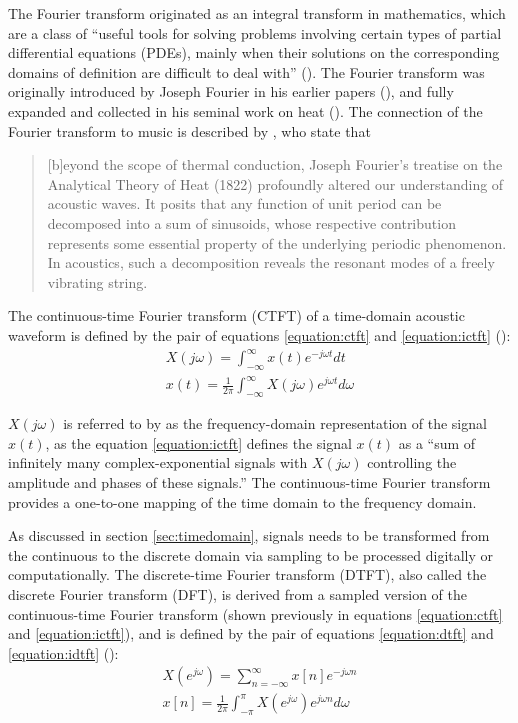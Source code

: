 \documentclass[report.tex]{subfiles}
\begin{document}
The Fourier transform originated as an integral transform in mathematics, which are a class of ``useful tools for solving problems involving certain types of partial differential equations (PDEs), mainly when their solutions on the corresponding domains of definition are difficult to deal with'' (\cite{fourierhistory}). The Fourier transform was originally introduced by Joseph Fourier in his earlier papers (\cite{fourierhist1, fourierhist2}), and fully expanded and collected in his seminal work on heat (\cite{fourierheat}). The connection of the Fourier transform to music is described by \textcite{fouriermusic}, who state that

\begin{quote}
	[b]eyond the scope of thermal conduction, Joseph Fourier's treatise on the Analytical Theory of Heat (1822) profoundly altered our understanding of acoustic waves. It posits that any function of unit period can be decomposed into a sum of sinusoids, whose respective contribution represents some essential property of the underlying periodic phenomenon. In acoustics, such a decomposition reveals the resonant modes of a freely vibrating string.
\end{quote}

The continuous-time Fourier transform (CTFT) of a time-domain acoustic waveform is defined by the pair of equations \ref{equation:ctft} and \ref{equation:ictft} (\cite[Chapter~11]{dspfirst}):
\begin{align}
	X(j\omega) = \int_{-\infty}^{\infty}{x(t)e^{-j\omega t}\mathit{dt}} \tag{1}\label{equation:ctft} \\
	x(t) = \frac{1}{2\pi}\int_{-\infty}^{\infty}{X(j\omega)e^{j\omega t}\mathit{d\omega}} \tag{2}\label{equation:ictft}
\end{align}

$X(j\omega)$ is referred to by \textcite{dspfirst} as the frequency-domain representation of the signal $x(t)$, as the equation \ref{equation:ictft} defines the signal $x(t)$ as a ``sum of infinitely many complex-exponential signals with $X(j\omega)$ controlling the amplitude and phases of these signals.'' The continuous-time Fourier transform provides a one-to-one mapping of the time domain to the frequency domain.

As discussed in section \ref{sec:timedomain}, signals needs to be transformed from the continuous to the discrete domain via sampling to be processed digitally or computationally. The discrete-time Fourier transform (DTFT), also called the discrete Fourier transform (DFT), is derived from a sampled version of the continuous-time Fourier transform (shown previously in equations \ref{equation:ctft} and \ref{equation:ictft}), and is defined by the pair of equations \ref{equation:dtft} and \ref{equation:idtft} (\cite[Chapter~12]{melbook}):
\begin{align}
	X(e^{j\omega}) = \sum_{n = -\infty}^{\infty}{x[n]e^{-j\omega n}} \tag{3}\label{equation:dtft} \\
	x[n] = \frac{1}{2\pi}\int_{-\pi}^{\pi}{X(e^{j\omega})e^{j\omega n}\mathit{d\omega}} \tag{4}\label{equation:idtft}
\end{align}
\end{document}
